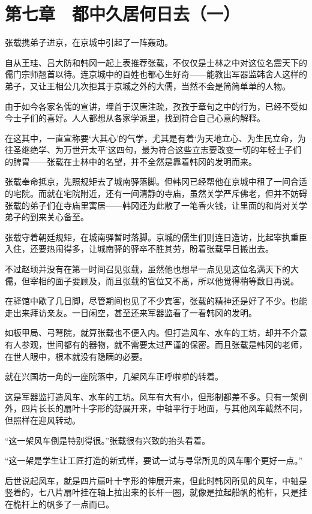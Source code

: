 \section{第七章　都中久居何日去（一）}

张载携弟子进京，在京城中引起了一阵轰动。

自从王珪、吕大防和韩冈一起上表推荐张载，不仅仅是士林之中对这位名震天下的儒门宗师翘首以待。连京城中的百姓也都心生好奇——能教出军器监韩舍人这样的弟子，又让王相公几次拒其于京城之外的大儒，当然不会是简简单单的人物。

由于如今各家名儒的宣讲，埋首于汉唐注疏，孜孜于章句之中的行为，已经不受如今士子们的喜好。人人都想从各家学派里，找到符合自己心意的解释。

在这其中，一直宣称要‘大其心’的气学，尤其是有着‘为天地立心、为生民立命，为往圣继绝学、为万世开太平’这四句，最为符合这些立志要改变一切的年轻士子们的脾胃——张载在士林中的名望，并不全然是靠着韩冈的发明而来。

张载奉命抵京，先照规矩去了城南驿落脚。但韩冈已经帮他在京城中租了一间合适的宅院。而就在宅院附近，还有一间清静的寺庙，虽然关学严斥佛老，但并不妨碍张载的弟子们在寺庙里寓居——韩冈还为此散了一笔香火钱，让里面的和尚对关学弟子的到来关心备至。

张载守着朝廷规矩，在城南驿暂时落脚。京城的儒生们则连日造访，比起宰执重臣入住，还要热闹得多，让城南驿的驿卒不胜其劳，盼着张载早日搬出去。

不过赵顼并没有在第一时间召见张载，虽然他也想早一点见见这位名满天下的大儒，但宰相的面子要顾及，而且张载的官位又不髙，所以他觉得稍等数日再说。

在驿馆中歇了几日脚，尽管期间也见了不少宾客，张载的精神还是好了不少。也能走出来拜访亲友。一日闲空，甚至还来军器监看了一看韩冈的发明。

如板甲局、弓弩院，就算张载也不便入内。但打造风车、水车的工坊，却并不介意有人参观，世间都有的器物，就不需要太过严谨的保密。而且张载是韩冈的老师，在世人眼中，根本就没有隐瞒的必要。

就在兴国坊一角的一座院落中，几架风车正呼啦啦的转着。

这是军器监打造风车、水车的工坊。风车有大有小，但形制都差不多。只有一架例外，四片长长的扇叶十字形的舒展开来，中轴平行于地面，与其他风车截然不同，但照样在迎风转动。

“这一架风车倒是特别得很。”张载很有兴致的抬头看着。

“这一架是学生让工匠打造的新式样，要试一试与寻常所见的风车哪个更好一点。”

后世说起风车，就是四片扇叶十字形的伸展开来，但此时韩冈所见的风车，中轴是竖着的，七八片扇叶挂在轴上拉出来的长杆一圈，就像是拉起船帆的桅杆，只是挂在桅杆上的帆多了一点而已。

